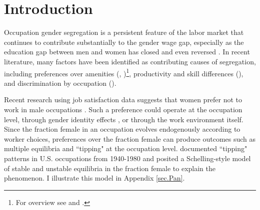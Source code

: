 \documentclass[11pt]{article}
\begin{document}
\newpage
\section{Introduction}



%



Occupation gender segregation is a persistent feature of the labor market that continues to contribute substantially to the gender wage gap, especially as the education gap between men and women has closed and even reversed \cite{Blau2006, Blau2013, Kahn2016a}. In recent literature, many factors have been identified as contributing causes of segregation, including preferences over amenities (, )\footnote{For overview see  and .}, productivity and skill differences (), and discrimination by occupation (). 

Recent research using job satisfaction data suggests that women prefer not to work in male occupations \cite{Usui2008, Lordan2015}. Such a preference could operate at the occupation level, through gender identity effects \cite{Akerlof2000}, or through the work environment itself. Since the fraction female in an occupation evolves endogenously according to worker choices, preferences over the fraction female can produce outcomes such as multiple equilibria and ``tipping" at the occupation level.  documented ``tipping" patterns in U.S. occupations from 1940-1980 and posited a Schelling-style model of stable and unstable equilibria in the fraction female to explain the phenomenon. I illustrate this model in Appendix \ref{sec.Pan}.


\end{document}
